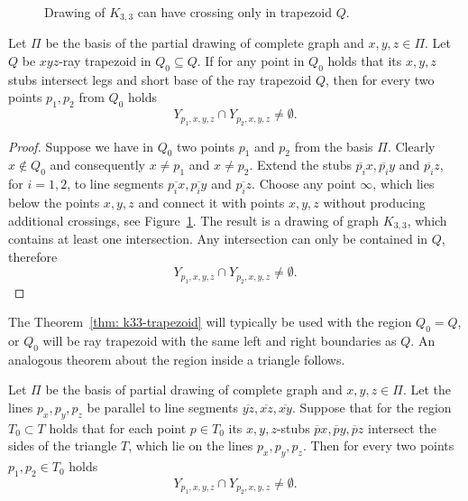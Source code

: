 \begin{figure}
\centering

\caption{Drawing of $K_{3,3}$ can have crossing only in trapezoid $Q$.}
\label{fig: k33-trapezoid}
\end{figure}


\begin{theorem}
\label{thm: k33-trapezoid}
Let $\Pi$ be the basis of the partial drawing of complete graph and $x,y,z \in \Pi$. Let $Q$ be $xyz$-ray trapezoid in $Q_{0} \subseteq Q$. If for any point in $Q_{0}$ holds that its $x, y, z$ stubs intersect legs and short base of the ray trapezoid $Q$, then for every two points $p_{1}, p_{2}$ from $Q_{0}$ holds
$$
Y_{p_{1},x,y,z} \cap Y_{p_{2},x,y,z} \neq \emptyset.
$$
\end{theorem}
\begin{proof}
Suppose we have in $Q_{0}$ two points $p_{1}$ and $p_{2}$ from the basis $\Pi$. Clearly  $x \not\in Q_{0}$ and consequently $x \neq p_{1}$ and $x \neq p_{2}$. Extend the stubs $\overline{p_{i}}x, \overline{p_{i}}y$ and $\overline{p_{i}}z$, for $i = 1,2$, to line segments $\overline{p_{i}x}, \overline{p_{i}y}$ and $\overline{p_{i}z}$. Choose any point $\infty$, which lies below the points $x,y,z$ and connect it with points $x,y,z$ without producing additional crossings, see Figure~\ref{fig: k33-trapezoid}. The result is a drawing of graph $K_{3, 3}$, which contains at least one intersection. Any intersection can only be contained in $Q$, therefore
$$
Y_{p_{1},x,y,z} \cap Y_{p_{2},x,y,z} \neq \emptyset.
$$
\end{proof}

The Theorem~\ref{thm: k33-trapezoid} will typically be used with the region $Q_{0} = Q$, or $Q_{0}$ will be ray trapezoid with the same left and right boundaries as $Q$. An analogous theorem about the region inside a triangle follows.


\begin{theorem}
\label{thm: k33-triangle}
Let $\Pi$ be the basis of partial drawing of complete graph and $x,y,z \in \Pi$. Let the lines $p_{x}, p_{y}, p_{z}$ be parallel to line segments $\overline{yz}, \overline{xz}, \overline{xy}$. Suppose that for the region $T_{0} \subset T$ holds that for each point $p \in T_{0}$ its $x,y,z$-stubs $\overline{p}x, \overline{p}y, \overline{p}z$ intersect the sides of the triangle $T$, which lie on the lines $p_{x}, p_{y}, p_{z}$. Then for every two points $p_{1}, p_{2} \in T_{0}$ holds
$$
Y_{p_{1},x,y,z} \cap Y_{p_{2},x,y,z} \neq \emptyset.
$$
\end{theorem}

